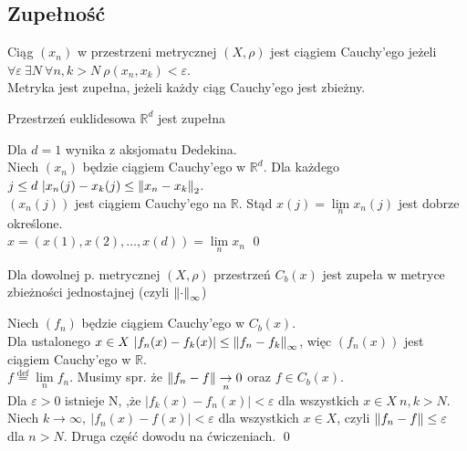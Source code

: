 \subsection{Zupełność} 
\begin{df} Ciąg $(x_n)$ w przestrzeni metrycznej $(X,\rho)$ jest ciągiem Cauchy'ego jeżeli $\forall \varepsilon \ \exists N \ 
    \forall n, k > N \ \rho(x_n,x_k) < \varepsilon$. \\ 
    Metryka jest zupełna, jeżeli każdy ciąg Cauchy'ego jest zbieżny. \end{df} 
\begin{tw} Przestrzeń euklidesowa $\mathbb{R}^d$ jest zupełna \end{tw} 
\begin{dd} 
    Dla $d=1$ wynika z aksjomatu Dedekina. \\
    Niech $(x_n)$ będzie ciągiem Cauchy'ego w $\mathbb{R}^d$. Dla każdego $ j \le d \ |x_n(j)-x_k(j) \le \left\lVert x_n - x_k\right\rVert_2$. \\
    $(x_n(j))$ jest ciągiem Cauchy'ego na $\mathbb{R}$. Stąd $x(j) = \lim\limits_n x_n(j)$ jest dobrze określone. \\
    $x = (x(1),x(2),\ldots,x(d)) = \lim\limits_n x_n$ \hfill \qed
\end{dd} 
\begin{tw} Dla dowolnej p. metrycznej $(X,\rho)$ przestrzeń $C_b(x)$ jest zupeła w metryce zbieżności jednostajnej (czyli $\left\lVert\cdot\right\rVert_\infty$) \end{tw} 
\begin{dd} Niech $(f_n)$ będzie ciągiem Cauchy'ego w $C_b(x)$. \\ 
    Dla ustalonego $x \in X \ |f_n(x) - f_k(x)| \le \left\lVert f_n-f_k\right\rVert_\infty$, więc $(f_n(x))$ jest ciągiem Cauchy'ego w $\mathbb{R}$. \\ 
    $f  \overset{\text{def}}{=} \lim\limits_n f_n$. Musimy spr. że $\left\lVert f_n-f\right\rVert \underset{n}{\rightarrow} 0$ oraz $f \in C_b(x)$. \\
    Dla $\varepsilon > 0$ istnieje N, ,że $|f_k(x) - f_n(x)| < \varepsilon$ dla wszystkich $x \in X \ n,k > N$.
    Niech $k \rightarrow \infty, \ |f_n(x)-f(x)| < \varepsilon$ dla wszystkich $x \in X$, czyli $\left\lVert f_n-f\right\rVert \le \varepsilon$ dla $n > N$.
    Druga część dowodu na ćwiczeniach. \hfill \qed
\end{dd}

